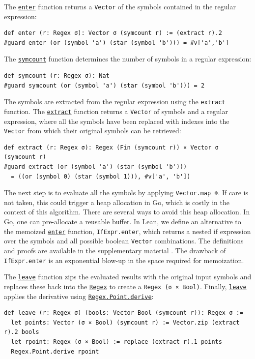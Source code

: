\documentclass[runningheads]{llncs}
\newcommand{\link}[2]{\mbox{\hyperref[#2]{\lstinline{#1}}}\xspace}
\newcommand{\Regex}{\link{Regex}{Regex}}
\newcommand{\symcount}{\link{symcount}{def symcount}}
\newcommand{\enter}{\link{enter}{def enter}}
\newcommand{\leave}{\link{leave}{def leave}}
\newcommand{\extract}{\link{extract}{def extract}}
\newcommand{\RegexPointDerive}{\link{Regex.Point.derive}{def Regex.Point.derive}}
\newcommand{\supplementarymaterial}{%
  \hyperref[supplementary_material]{supplementary material}\xspace%
}
\begin{document}
The \enter function returns a \lstinline{Vector} of the symbols contained in the regular expression:
\begin{lstlisting}[label=def enter]
def enter (r: Regex σ): Vector σ (symcount r) := (extract r).2
#guard enter (or (symbol 'a') (star (symbol 'b'))) = #v['a','b']
\end{lstlisting}

The \symcount function determines the number of symbols in a regular expression:
\begin{lstlisting}[label=def symcount]
def symcount (r: Regex σ): Nat
#guard symcount (or (symbol 'a') (star (symbol 'b'))) = 2
\end{lstlisting}

The symbols are extracted from the regular expression using the \extract function.
The \extract function returns a \lstinline{Vector} of symbols and a regular expression, where all the symbols have been replaced with indexes into the \lstinline{Vector} from which their original symbols can be retrieved:
\begin{lstlisting}[label=def extract]
def extract (r: Regex σ): Regex (Fin (symcount r)) × Vector σ (symcount r)
#guard extract (or (symbol 'a') (star (symbol 'b')))
  = ((or (symbol 0) (star (symbol 1))), #v['a', 'b'])
\end{lstlisting}

The next step is to evaluate all the symbols by applying \lstinline{Vector.map Φ}.
If care is not taken, this could trigger a heap allocation in Go, which is costly in the context of this algorithm.
There are several ways to avoid this heap allocation.
In Go, one can pre-allocate a reusable buffer.
In Lean, we define an alternative to the memoized \enter function, \lstinline{IfExpr.enter}, which returns a nested if expression over the symbols and all possible boolean \lstinline{Vector} combinations.
The definitions and proofs are available in the \supplementarymaterial.
The drawback of \lstinline{IfExpr.enter} is an exponential blow-up in the space required for memoization.

The \leave function zips the evaluated results with the original input symbols and replaces these back into the \Regex to create a \lstinline{Regex (σ × Bool)}.
Finally, \leave applies the derivative using \RegexPointDerive:
\begin{lstlisting}[label=def leave]
def leave (r: Regex σ) (bools: Vector Bool (symcount r)): Regex σ :=
  let points: Vector (σ × Bool) (symcount r) := Vector.zip (extract r).2 bools
  let rpoint: Regex (σ × Bool) := replace (extract r).1 points
  Regex.Point.derive rpoint
\end{lstlisting}
\end{document}
